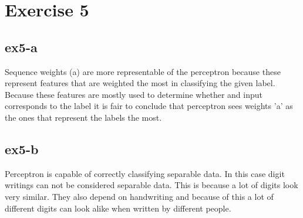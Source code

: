 \section{Exercise 5}
\subsection{ex5-a}
Sequence weights (a) are more representable of the perceptron because these represent features that are weighted the
most in classifying the given label. Because these features are mostly used to determine whether and input corresponds
to the label it is fair to conclude that perceptron sees weights 'a' as the ones that represent the labels the most.

\subsection{ex5-b}
Perceptron is capable of correctly classifying separable data. In this case digit writings can not be considered
separable data. This is because a lot of digits look very similar. They also depend on handwriting and because of this
a lot of different digits can look alike when written by different people.